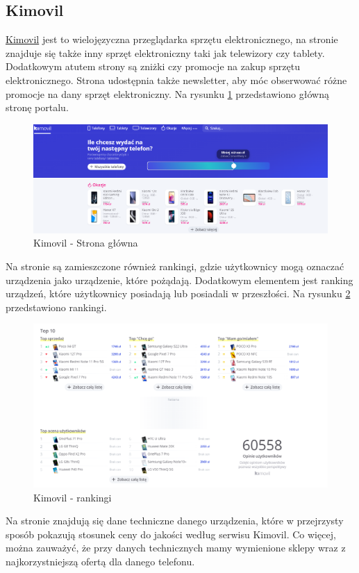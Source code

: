 \subsection{Kimovil}
\href{https://www.kimovil.com/pl/}{Kimovil} \cite{kimovil} jest to wielojęzyczna przeglądarka sprzętu elektronicznego, na stronie znajduje się także inny sprzęt elektroniczny taki jak telewizory czy tablety. Dodatkowym atutem strony są zniżki czy promocje na zakup sprzętu elektronicznego. Strona udostępnia także newsletter, aby móc obserwować różne promocje na dany sprzęt elektroniczny. Na rysunku \ref*{kimovil_1} przedstawiono główną stronę portalu.
\begin{figure}[H]
    \centering
    \includegraphics[scale=0.36]{img/Kimovil/kimovil.png}
    \caption{Kimovil - Strona główna}
    \label{kimovil_1}
\end{figure}
Na stronie są zamieszczone również rankingi, gdzie użytkownicy mogą oznaczać urządzenia jako urządzenie, które pożądają. Dodatkowym elementem jest ranking urządzeń, które użytkownicy posiadają lub posiadali w przeszłości.
Na rysunku \ref*{kimovil_2} przedstawiono rankingi.
\begin{figure}[H]
    \centering
    \includegraphics[scale=0.448]{img/Kimovil/rankingsKimovil.png}
    \caption{Kimovil - rankingi}
    \label{kimovil_2}
\end{figure}
Na stronie znajdują się dane techniczne danego urządzenia, które w przejrzysty sposób pokazują stosunek ceny do jakości według serwisu Kimovil. Co więcej, można zauważyć, że przy danych technicznych mamy wymienione sklepy wraz z najkorzystniejszą ofertą dla danego telefonu. 

